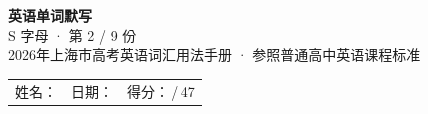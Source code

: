 \documentclass[10pt,a4paper]{article}
\begin{document}
\pagestyle{plain}

\begin{center}
{\LARGE\bfseries 英语单词默写}\\[0.22em]
{\large S 字母 · 第 2 / 9 份}\\[0.18em]
{\small 2026年上海市高考英语词汇用法手册 · 参照普通高中英语课程标准}
\end{center}

\vspace{0.25em}
\noindent\begin{tabular}{@{}p{}@{}p{}@{}p{}@{}}
姓名：\underline{\hspace{2.0cm}} & 日期：\underline{\hspace{2.0cm}} & 得分：\underline{\hspace{1.3cm}}\,/\,47 \\
\end{tabular}

\vspace{0.3em}

\vspace{0.08em}
\end{document}
